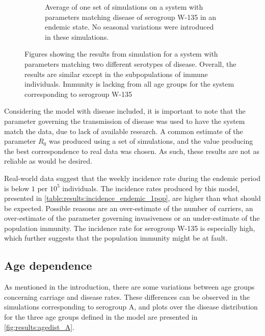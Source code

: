 \documentclass[10pt,a4paper]{article}
\begin{document}
\begin{figure}[h]
\begin{subfigure}{0.45\textwidth}
		\caption{Average of one set of simulations on a system with parameters matching disease of serogroup W-135 in an endemic state. No seasonal variations were introduced in these simulations.} \label{fig:results:endemic_disease_W135}
	\end{subfigure}
	\caption{Figures showing the results from simulation for a system with parameters matching two different serotypes of disease. Overall, the results are similar except in the subpopulations of immune individuals. Immunity is lacking from all age groups for the system corresponding to serogroup W-135} \label{fig:results:endemic_disease}
\end{figure}

Considering the model with disease included, it is important to note that the parameter governing the transmission of disease was used to have the system match the data, due to lack of available research. A common estimate of the parameter $R_0$ was produced using a set of simulations, and the value producing the best correspondence to real data was chosen. As such, these results are not as reliable as would be desired.

Real-world data suggest that the weekly incidence rate during the endemic period is below $1$ per $10^5$ individuals. The incidence rates produced by this model, presented in \cref{table:results:incidence_endemic_1pop}, are higher than what should be expected. Possible reasons are an over-estimate of the number of carriers, an over-estimate of the parameter governing invasiveness or an under-estimate of the population immunity. The incidence rate for serogroup W-135 is especially high, which further suggests that the population immunity might be at fault.

\subsection{Age dependence}

As mentioned in the introduction, there are some variations between age groups concerning carriage and disease rates. These differences can be observed in the simulations corresponding to serogroup A, and plots over the disease distribution for the three age groups defined in the model are presented in \cref{fig:results:agedist_A}.
\end{document}
